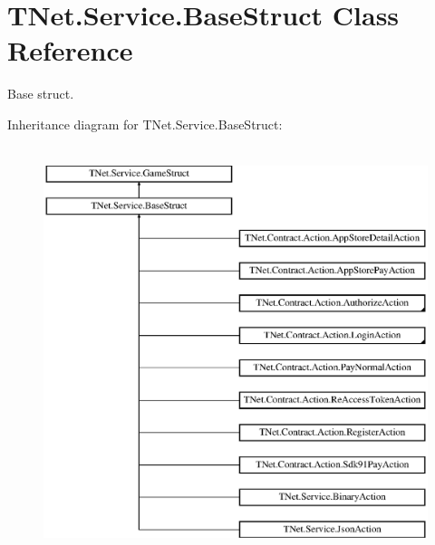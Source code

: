 \hypertarget{class_t_net_1_1_service_1_1_base_struct}{}\section{T\+Net.\+Service.\+Base\+Struct Class Reference}
\label{class_t_net_1_1_service_1_1_base_struct}


Base struct.  


Inheritance diagram for T\+Net.\+Service.\+Base\+Struct\+:\begin{figure}[H]
\begin{center}
\leavevmode
\includegraphics[height=12.000000cm]{class_t_net_1_1_service_1_1_base_struct}
\end{center}
\end{figure}
